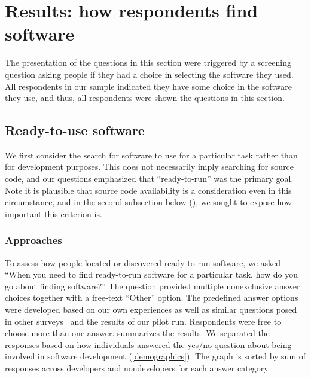\documentclass{casicswhitepaper}
\begin{document}
\section{Results: how respondents find software}

The presentation of the questions in this section were triggered by a screening question asking people if they had a choice in selecting the software they used.  All respondents in our sample indicated they have some choice in the software they use, and thus, all respondents were shown the questions in this section.


\subsection{Ready-to-use software}
 
We first consider the search for software to use for a particular task rather than for development purposes. This does not necessarily imply searching for source code, and our questions emphasized that ``ready-to-run'' was the primary goal.  Note it is plausible that source code availability is a consideration even in this circumstance, and in the second subsection below (), we sought to expose how important this criterion is.

 
\subsubsection{Approaches}
\label{approaches-ready-to-use}

To assess how people located or discovered ready-to-run software, we asked ``When you need to find ready-to-run software for a particular task, how do you go about finding software?''  The question provided multiple nonexclusive answer choices together with a free-text ``Other'' option.  The predefined answer options were developed based on our own experiences as well as similar questions posed in other surveys~\cite{sim_2011, bajrachary_2009, linstead_2009} and the results of our pilot run.  Respondents were free to choose more than one answer.   summarizes the results.  We separated the responses based on how individuals answered the yes/no question about being involved in software development (\ref{demographics}).  The graph is sorted by sum of responses across developers and nondevelopers for each answer category.
\end{document}
